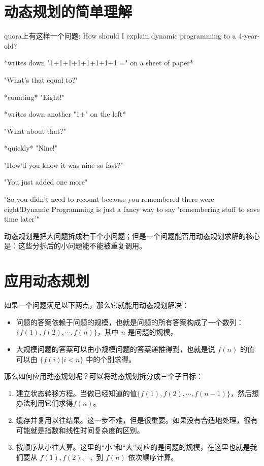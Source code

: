 \documentclass[12pt]{article}
\begin{document}

\section{动态规划的简单理解 \cite{Simple_DynamicProgramming}}

quora上有这样一个问题: How should I explain dynamic programming to a 4-year-old?

*writes down "1+1+1+1+1+1+1+1 =" on a sheet of paper*

"What's that equal to?"

*counting* "Eight!"

*writes down another "1+" on the left*

"What about that?"

*quickly* "Nine!"

"How'd you know it was nine so fast?"

"You just added one more"

"So you didn't need to recount because you remembered there were eight!Dynamic Programming is just a fancy way to say 'remembering stuff to save time later'"

动态规划是把大问题拆成若干个小问题；但是一个问题能否用动态规划求解的核心是：这些分拆后的小问题能不能被重复调用。

\section{应用动态规划\cite{Simple_DynamicProgramming-2}}
如果一个问题满足以下两点，那么它就能用动态规划解决：

\begin{itemize}[itemindent=2em]
    \item 问题的答案依赖于问题的规模，也就是问题的所有答案构成了一个数列：$\{f(1),f(2), \cdots, f(n)\}$，其中 $n$ 是问题的规模。
    
    \item 大规模问题的答案可以由小规模问题的答案递推得到，也就是说 $f(n)$ 的值可以由 $\{f(i)|i<n\}$ 中的个别求得。
\end{itemize}

那么如何应用动态规划呢？可以将动态规划拆分成三个子目标：

\begin{enumerate}[itemindent=2em]
    \item 建立状态转移方程。当做已经知道的值$\{f(1),f(2), \cdots, f(n-1)\}$，然后想办法利用它们求得$f(n)$。
    
    \item 缓存并复用以往结果。这一步不难，但是很重要。如果没有合适地处理，很有可能就是指数和线性时间复杂度的区别。

    \item 按顺序从小往大算。这里的“小”和“大”对应的是问题的规模，在这里也就是我们要从 $f(1), f(2), \cdots, $ 到 $f(n)$ 依次顺序计算。
\end{enumerate}



\end{document}

